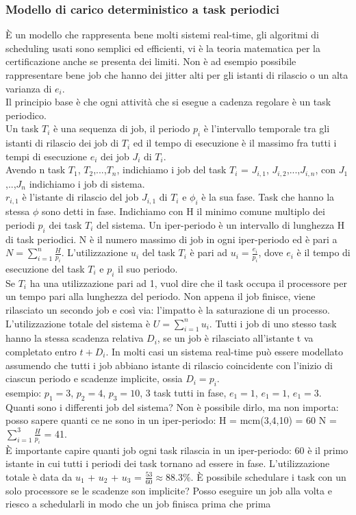 \documentclass{article}
\begin{document}
\subsubsection{Modello di carico deterministico a task periodici}
È un modello che rappresenta bene molti sistemi real-time, gli algoritmi di scheduling usati sono semplici ed efficienti, vi è la teoria matematica per la certificazione anche se presenta dei limiti. Non è ad esempio possibile rappresentare bene job che hanno dei jitter alti per gli istanti di rilascio o un alta varianza di $e_i$.\\ Il principio base è che ogni attività che si esegue a cadenza regolare è un task periodico.\\ Un task $T_i$ è una sequenza di job, il periodo $p_i$ è l'intervallo temporale tra gli istanti di rilascio dei job di $T_i$ ed il tempo di esecuzione è il massimo fra tutti i tempi di esecuzione $e_i$ dei job $J_i$ di $T_i$.\\ Avendo n task $T_1$, $T_2$,...,$T_n$, indichiamo i job del task $T_i$ = $J_{i,1}$, $J_{i,2}$,...,$J_{i,n}$, con $J_1$,..,$J_n$ indichiamo i job di sistema.\\ $r_{i,1}$ è l'istante di rilascio del job $J_{i,1}$ di $T_i$ e $\phi_i$ è la sua fase. Task che hanno la stessa $\phi$ sono detti in fase. Indichiamo con H il minimo comune multiplo dei periodi $p_i$ dei task $T_i$ del sistema. Un iper-periodo è un intervallo di lunghezza H di task periodici. N è il numero massimo di job in ogni iper-periodo ed è pari a $N = \sum\limits_{i=1}^{n} \frac{H}{p_i}$. L'utilizzazione $u_i$ del task $T_i$ è pari ad $u_i = \frac{e_i}{p_i}$, dove $e_i$ è il tempo di esecuzione del task $T_i$ e $p_i$ il suo periodo.\\ Se $T_i$ ha una utilizzazione pari ad 1, vuol dire che il task occupa il processore per un tempo pari alla lunghezza del periodo. Non appena il job finisce, viene rilasciato un secondo job e così via: l'impatto è la saturazione di un processo.\\ L'utilizzazione totale del sistema è $U = \sum\limits_{i=1}^{n} u_i$. Tutti i job di uno stesso task hanno la stessa scadenza relativa $D_i$, se un job è rilasciato all'istante t va completato entro $t + D_i$. In molti casi un sistema real-time può essere modellato assumendo che tutti i job abbiano istante di rilascio coincidente con l'inizio di ciascun periodo e scadenze implicite, ossia $D_i = p_i$.\\ esempio: $p_1 = 3$, $p_2 = 4$, $p_3 = 10$, 3 task tutti in fase, $e_1 = 1$, $e_1 = 1$, $e_1 = 3$. Quanti sono i differenti job del sistema? Non è possibile dirlo, ma non importa: posso sapere quanti ce ne sono in un iper-periodo: H = mcm(3,4,10) = 60  N = $\sum\limits_{i=1}^{3} \frac{H}{p_i}$ = 41.\\ È importante capire quanti job ogni task rilascia in un iper-periodo: 60 è il primo istante in cui tutti i periodi dei task tornano ad essere in fase. L'utilizzazione totale è data da $u_1$ + $u_2$ + $u_3$ = $\frac{53}{60} \approx 88.3\%$. È possibile schedulare i task con un solo processore se le scadenze son implicite? Posso eseguire un job alla volta e riesco a schedularli in modo che un job finisca prima che prima 
\end{document}
